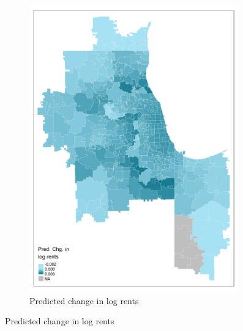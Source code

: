 \documentclass[aspectratio=169, t]{beamer}
\begin{document}
\begin{frame}[label = example_pred_chi_07_2019]
\begin{figure}
\begin{subfigure}{0.33\textwidth}
                         \includegraphics[width = 0.99\textwidth]{prediction_events/output/chicago_2019-7_hatfe_d_ln_rents_baseline.png}
            \caption*{Predicted change in log rents}
        \end{subfigure}
    \end{figure}
    
    \hyperlink{static_tab}{}
\end{frame}
\end{document}
